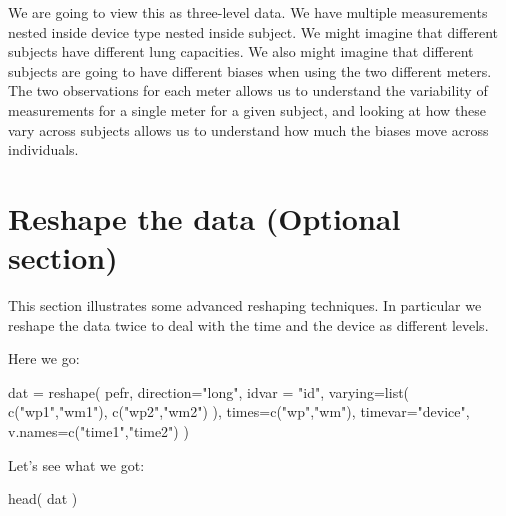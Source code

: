 \documentclass[
  letterpaper,
  DIV=11,
  numbers=noendperiod]{scrreprt}
\newenvironment{Shaded}{\begin{snugshade}}{\end{snugshade}}
\newcommand{\AttributeTok}[1]{\textcolor[rgb]{0.49,0.56,0.16}{#1}}
\newcommand{\FunctionTok}[1]{\textcolor[rgb]{0.02,0.16,0.49}{#1}}
\newcommand{\NormalTok}[1]{\textcolor[rgb]{0.00,0.44,0.13}{#1}}
\newcommand{\OtherTok}[1]{\textcolor[rgb]{0.00,0.44,0.13}{#1}}
\newcommand{\StringTok}[1]{\textcolor[rgb]{0.25,0.44,0.63}{#1}}
\begin{document}
We are going to view this as three-level data. We have multiple
measurements nested inside device type nested inside subject. We might
imagine that different subjects have different lung capacities. We also
might imagine that different subjects are going to have different biases
when using the two different meters. The two observations for each meter
allows us to understand the variability of measurements for a single
meter for a given subject, and looking at how these vary across subjects
allows us to understand how much the biases move across individuals.

\hypertarget{reshape-the-data-optional-section}{%
\section{Reshape the data (Optional
section)}\label{reshape-the-data-optional-section}}

This section illustrates some advanced reshaping techniques. In
particular we reshape the data twice to deal with the time and the
device as different levels.

Here we go:

\begin{Shaded}
\begin{Highlighting}[]
\NormalTok{dat }\OtherTok{=} \FunctionTok{reshape}\NormalTok{( pefr, }\AttributeTok{direction=}\StringTok{"long"}\NormalTok{, }\AttributeTok{idvar =} \StringTok{"id"}\NormalTok{, }
               \AttributeTok{varying=}\FunctionTok{list}\NormalTok{( }\FunctionTok{c}\NormalTok{(}\StringTok{"wp1"}\NormalTok{,}\StringTok{"wm1"}\NormalTok{), }\FunctionTok{c}\NormalTok{(}\StringTok{"wp2"}\NormalTok{,}\StringTok{"wm2"}\NormalTok{) ),}
               \AttributeTok{times=}\FunctionTok{c}\NormalTok{(}\StringTok{"wp"}\NormalTok{,}\StringTok{"wm"}\NormalTok{),}
               \AttributeTok{timevar=}\StringTok{"device"}\NormalTok{,}
               \AttributeTok{v.names=}\FunctionTok{c}\NormalTok{(}\StringTok{"time1"}\NormalTok{,}\StringTok{"time2"}\NormalTok{) )}
\end{Highlighting}
\end{Shaded}

Let's see what we got:

\begin{Shaded}
\begin{Highlighting}[]
\FunctionTok{head}\NormalTok{( dat )}
\end{Highlighting}
\end{Shaded}
\end{document}
